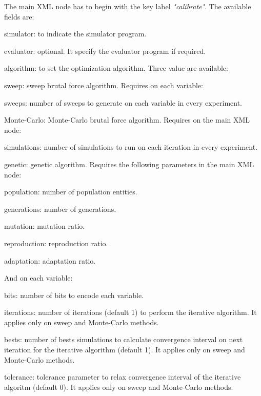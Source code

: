 \documentclass[review,authoryear]{elsarticle}
\begin{document}
The main XML node has to begin with the key label \emph{"calibrate"}. The
available fields are:
\begin{description}
\item{simulator}: to indicate the simulator program.
\item{evaluator}: optional. It specify the evaluator program if required.
\item{algorithm}: to set the optimization algorithm. Three value are available:
	\begin{description}
	\item{sweep}: sweep brutal force algorithm. Requires on each variable:
		\begin{description}
		\item{sweeps}: number of sweeps to generate on each variable in every
			experiment.
		\end{description}
	\item{Monte-Carlo}: Monte-Carlo brutal force algorithm. Requires on the main
		XML node:
		\begin{description}
		\item{simulations}: number of simulations to run on each iteration in
			every experiment.
		\end{description}
	\item{genetic}: genetic algorithm. Requires the following parameters in the
		main XML node:
		\begin{description}
		\item{population}: number of population entities.
		\item{generations}: number of generations.
		\item{mutation}: mutation ratio.
		\item{reproduction}: reproduction ratio.
		\item{adaptation}: adaptation ratio.
		\end{description}
	And on each variable:
		\begin{description}
		\item{bits}: number of bits to encode each variable.
		\end{description}
	\end{description}
\item{iterations}: number of iterations (default 1) to perform the iterative
algorithm. It applies only on sweep and Monte-Carlo methods.
\item{bests}: number of bests simulations to calculate convergence interval on
next iteration for the iterative algorithm (default 1). It applies only on
sweep and Monte-Carlo methods.
\item{tolerance}: tolerance parameter to relax convergence interval of the
iterative algoritm (default 0). It applies only on sweep and Monte-Carlo
methods.
\end{description}
\end{document}
